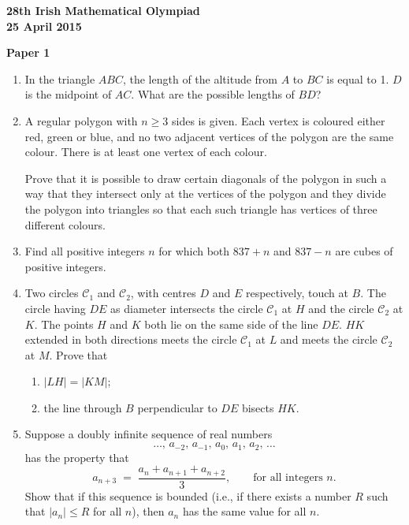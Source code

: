 \documentclass[12pt]{article}
\begin{document}
\begin{center}
{\large\bfseries 28th Irish Mathematical Olympiad\\25 April 2015}
\end{center}
\bigskip\noindent\textbf{Paper 1}\bigskip
\begin{enumerate}
\item In the triangle $ABC$, the length of the altitude from $A$ to $BC$ is equal to 1. $D$ is the midpoint of $AC$. What are the possible lengths of $BD$?

\item A regular polygon with $n \geq 3$ sides is given. Each vertex is coloured either red, green or blue, and no two adjacent vertices of the polygon are the same colour. There is at least one vertex of each colour.

Prove that it is possible to draw certain diagonals of the polygon in such a way that they intersect only at the vertices of the polygon and they divide the polygon into triangles so that each such triangle has vertices of three different colours.

\item Find all positive integers $n$ for which both $837 + n$ and $837 - n$ are cubes of positive integers.

\item Two circles $\mathcal{C}_1$ and $\mathcal{C}_2$, with centres $D$ and $E$ respectively, touch at $B$. The circle having $DE$ as diameter intersects the circle $\mathcal{C}_1$ at $H$ and the circle $\mathcal{C}_2$ at $K$. The points $H$ and $K$ both lie on the same side of the line $DE$. $HK$ extended in both directions meets the circle $\mathcal{C}_1$ at $L$ and meets the circle $\mathcal{C}_2$ at $M$. Prove that
\begin{enumerate}
\item[(a)] $|LH| = |KM|$;
\item[(b)] the line through $B$ perpendicular to $DE$ bisects $HK$.
\end{enumerate}

\item Suppose a doubly infinite sequence of real numbers
\[
\ldots,\, a_{-2},\, a_{-1},\, a_0,\, a_1,\, a_2,\, \ldots
\]
has the property that
\[
a_{n+3} \;=\; \frac{a_n + a_{n+1} + a_{n+2}}{3}, \qquad \text{for all integers } n.
\]
Show that if this sequence is bounded (i.e., if there exists a number $R$ such that $|a_n| \leq R$ for all $n$), then $a_n$ has the same value for all $n$.
\end{enumerate}
\end{document}
